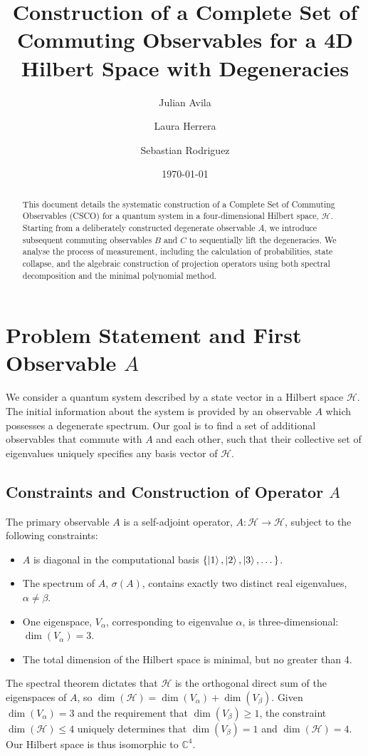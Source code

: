 \documentclass[11pt,a4paper]{article}
\title{Construction of a Complete Set of Commuting Observables for a 4D Hilbert
Space with Degeneracies}
\author{Julian Avila \and Laura Herrera \and Sebastian Rodriguez}
\date{\today}
\begin{document}
\maketitle

\begin{abstract}
This document details the systematic construction of a Complete Set of Commuting
Observables (CSCO) for a quantum system in a four-dimensional Hilbert space,
$\mathcal{H}$. Starting from a deliberately constructed degenerate observable
$A$, we introduce subsequent commuting observables $B$ and $C$ to sequentially
lift the degeneracies. We analyse the process of measurement, including the
calculation of probabilities, state collapse, and the algebraic construction of
projection operators using both spectral decomposition and the minimal
polynomial method.
\end{abstract}

\section{Problem Statement and First Observable \texorpdfstring{$A$}{A}}

We consider a quantum system described by a state vector in a Hilbert space
$\mathcal{H}$. The initial information about the system is provided by an
observable $A$ which possesses a degenerate spectrum. Our goal is to find a set
of additional observables that commute with $A$ and each other, such that their
collective set of eigenvalues uniquely specifies any basis vector of
$\mathcal{H}$.

\subsection{Constraints and Construction of Operator \texorpdfstring{$A$}{A}}
The primary observable $A$ is a self-adjoint operator, $A: \mathcal{H} \to
\mathcal{H}$, subject to the following constraints:
\begin{itemize}
  \item $A$ is diagonal in the computational basis $\{\ket{1}, \ket{2}, \ket{3},
    \dots\}$.
  \item The spectrum of $A$, $\sigma(A)$, contains exactly two distinct real
    eigenvalues, $\alpha \neq \beta$.
  \item One eigenspace, $V_\alpha$, corresponding to eigenvalue $\alpha$, is
    three-dimensional: $\dim(V_\alpha) = 3$.
  \item The total dimension of the Hilbert space is minimal, but no greater than
    4.
\end{itemize}
The spectral theorem dictates that $\mathcal{H}$ is the orthogonal direct sum of
the eigenspaces of $A$, so $\dim(\mathcal{H}) = \dim(V_\alpha) + \dim(V_\beta)$.
Given $\dim(V_\alpha) = 3$ and the requirement that $\dim(V_\beta) \ge 1$, the
constraint $\dim(\mathcal{H}) \le 4$ uniquely determines that $\dim(V_\beta) =
1$ and $\dim(\mathcal{H}) = 4$. Our Hilbert space is thus isomorphic to
$\mathbb{C}^4$.
\end{document}
